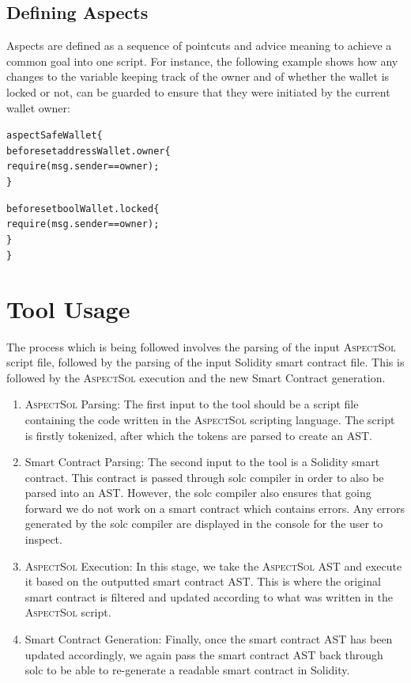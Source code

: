 \documentclass{article}
\newcommand{\AspectSol}{\textsc{AspectSol}\xspace}
\begin{document}
\subsection{Defining Aspects}
Aspects are defined as a sequence of pointcuts and advice meaning to achieve a common goal into one script. For instance, the following example shows how any changes to the variable keeping track of the owner and of whether the wallet is locked or not, can be guarded to ensure that they were initiated by the current wallet owner:

\begin{alltt}
aspect SafeWallet \{
   before set address Wallet.owner \{
     require(msg.sender == owner);
   \}

   before set bool Wallet.locked \{
      require(msg.sender == owner);
   \}
\}
\end{alltt}
	


\section{Tool Usage}

The process which is being followed involves the parsing of the input \AspectSol script file, followed by the parsing of the input Solidity smart contract file. This is followed by the \AspectSol execution and the new Smart Contract generation.

\begin{enumerate}
	\item \AspectSol Parsing: The first input to the tool should be a script file containing the code written in the \AspectSol scripting language. The script is firstly tokenized, after which the tokens are parsed to create an AST.
	\item Smart Contract Parsing: The second input to the tool is a Solidity smart contract. This contract is passed through solc compiler in order to also be parsed into an AST. However, the solc compiler also ensures that going forward we do not work on a smart contract which contains errors. Any errors generated by the solc compiler are displayed in the console for the user to inspect.
	\item \AspectSol Execution: In this stage, we take the \AspectSol AST and execute it based on the outputted smart contract AST. This is where the original smart contract is filtered and updated according to what was written in the \AspectSol script.
	\item Smart Contract Generation: Finally, once the smart contract AST has been updated accordingly, we again pass the smart contract AST back through solc to be able to re-generate a readable smart contract in Solidity.
\end{enumerate}
\end{document}
